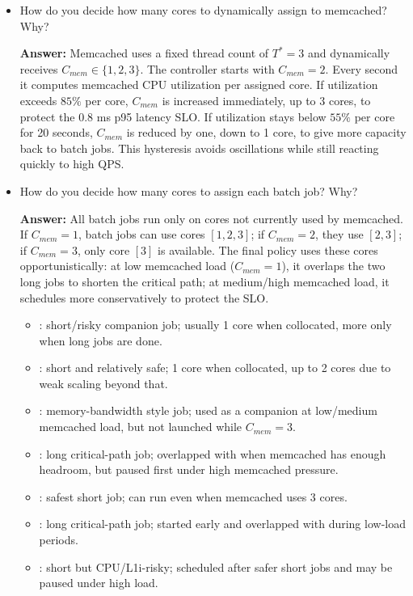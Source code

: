 \begin{enumerate}
\begin{itemize}
    \item How do you decide how many cores to dynamically assign to memcached? Why?
    
    \textbf{Answer:}
Memcached uses a fixed thread count of $T^*=3$ and dynamically receives $C_{mem}\in\{1,2,3\}$. The controller starts with $C_{mem}=2$. Every second it computes memcached CPU utilization per assigned core. If utilization exceeds $85\%$ per core, $C_{mem}$ is increased immediately, up to 3 cores, to protect the 0.8 ms p95 latency SLO. If utilization stays below $55\%$ per core for 20 seconds, $C_{mem}$ is reduced by one, down to 1 core, to give more capacity back to batch jobs. This hysteresis avoids oscillations while still reacting quickly to high QPS.

    \item How do you decide how many cores to assign each batch job? Why?

     \textbf{Answer:}
All batch jobs run only on cores not currently used by memcached. If $C_{mem}=1$, batch jobs can use cores $[1,2,3]$; if $C_{mem}=2$, they use $[2,3]$; if $C_{mem}=3$, only core $[3]$ is available. The final policy uses these cores opportunistically: at low memcached load ($C_{mem}=1$), it overlaps the two long jobs to shorten the critical path; at medium/high memcached load, it schedules more conservatively to protect the SLO.


\begin{itemize}
    \item {}: short/risky companion job; usually 1 core when collocated, more only when long jobs are done.
    \item {}: short and relatively safe; 1 core when collocated, up to 2 cores due to weak scaling beyond that.
    \item {}: memory-bandwidth style job; used as a companion at low/medium memcached load, but not launched while $C_{mem}=3$.
    \item {}: long critical-path job; overlapped with  when memcached has enough headroom, but paused first under high memcached pressure.
    \item {}: safest short job; can run even when memcached uses 3 cores.
    \item {}: long critical-path job; started early and overlapped with  during low-load periods.
    \item {}: short but CPU/L1i-risky; scheduled after safer short jobs and may be paused under high load.
\end{itemize}


\end{itemize}
\end{enumerate}
